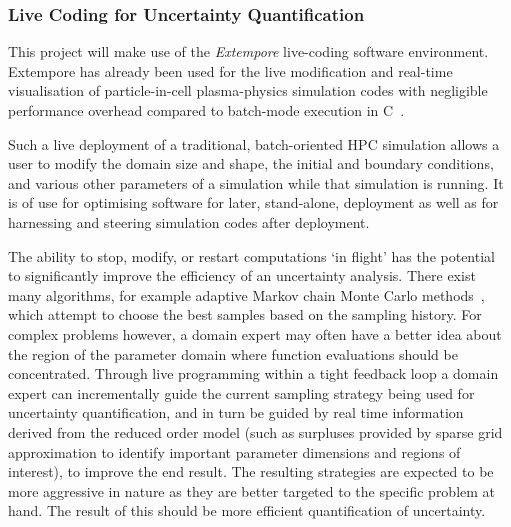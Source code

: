\subsubsection*{Live Coding for Uncertainty
  Quantification}

This project will
make use of the \emph{Extempore} live-coding software
environment.%
 Extempore has already
been used for the live modification and real-time visualisation of
particle-in-cell plasma-physics simulation codes with
negligible performance overhead compared to batch-mode execution in
C~\parencite{swiftLive2016}. 



Such a live deployment of a traditional, batch-oriented HPC simulation allows a user to 
modify the
domain size and shape, the initial and boundary conditions, and various
other parameters of a simulation while that simulation is running. It is of use
for optimising software for later, stand-alone,
deployment as well as for harnessing and steering simulation codes
after deployment.


The ability to stop, modify, or restart computations `in flight' has
the potential to significantly improve the efficiency of an
uncertainty analysis. There exist many algorithms, for example
adaptive Markov chain Monte Carlo methods~\parencite{GilksEtal1994}, 
which attempt to choose the best samples based on the sampling
history. For complex problems however, a domain expert
may often have
a better idea about the region of the parameter domain where function
evaluations should be concentrated. Through live programming within a
tight feedback loop a domain expert can incrementally guide the
current sampling strategy being used for uncertainty 
quantification, and in turn be guided by 
real time information derived from the reduced order model 
(such as surpluses
provided by sparse grid approximation to 
identify important parameter dimensions and regions of interest), 
to improve the end result. The resulting strategies are expected to be
more aggressive in nature as they are better targeted to the specific
problem at hand. The result of this should be more efficient quantification of
uncertainty.


